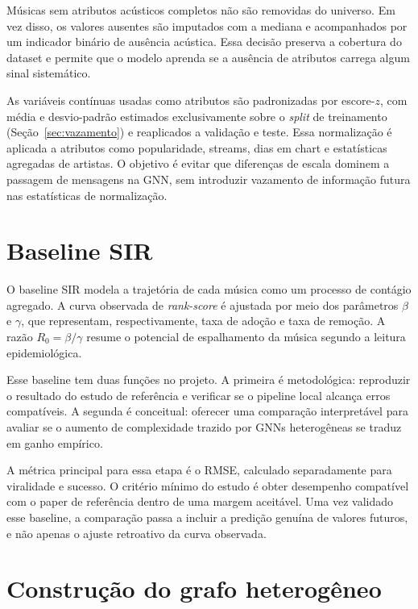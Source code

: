 Músicas sem atributos acústicos completos não são removidas do universo. Em vez disso, os valores ausentes são imputados com a mediana e acompanhados por um indicador binário de ausência acústica. Essa decisão preserva a cobertura do dataset e permite que o modelo aprenda se a ausência de atributos carrega algum sinal sistemático.

As variáveis contínuas usadas como atributos são padronizadas por escore-$z$, com média e desvio-padrão estimados exclusivamente sobre o \emph{split} de treinamento (Seção~\ref{sec:vazamento}) e reaplicados a validação e teste. Essa normalização é aplicada a atributos como popularidade, streams, dias em chart e estatísticas agregadas de artistas. O objetivo é evitar que diferenças de escala dominem a passagem de mensagens na GNN, sem introduzir vazamento de informação futura nas estatísticas de normalização.


\section{Baseline SIR}

O baseline SIR modela a trajetória de cada música como um processo de contágio agregado. A curva observada de \emph{rank-score} é ajustada por meio dos parâmetros $\beta$ e $\gamma$, que representam, respectivamente, taxa de adoção e taxa de remoção. A razão $R_0 = \beta / \gamma$ resume o potencial de espalhamento da música segundo a leitura epidemiológica.

Esse baseline tem duas funções no projeto. A primeira é metodológica: reproduzir o resultado do estudo de referência e verificar se o pipeline local alcança erros compatíveis. A segunda é conceitual: oferecer uma comparação interpretável para avaliar se o aumento de complexidade trazido por GNNs heterogêneas se traduz em ganho empírico.

A métrica principal para essa etapa é o RMSE, calculado separadamente para viralidade e sucesso. O critério mínimo do estudo é obter desempenho compatível com o paper de referência dentro de uma margem aceitável. Uma vez validado esse baseline, a comparação passa a incluir a predição genuína de valores futuros, e não apenas o ajuste retroativo da curva observada.


\section{Construção do grafo heterogêneo}
\label{sec:grafo}


